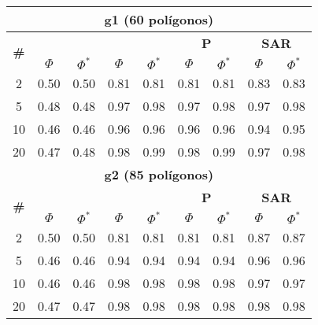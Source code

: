 \begin{table}
\begin{small}
		\bigskip
		\begin{tabular}{|c|cc|cc|cc|cc|}
			\hline
			\multicolumn{9}{|c|}{\textbf{g1 (60 pol\'igonos)}}\\
			\hline			
			\multirow{2}{*}{\textbf{\#}} &
			\multicolumn{2}{c|}{\textbf{\astar}} &
			\multicolumn{2}{c|}{\textbf{\ambush}} &
			\multicolumn{2}{c|}{\textbf{P}} &
			\multicolumn{2}{c|}{\textbf{SAR}}\\
			& $\Phi$ & $\Phi^*$ & $\Phi$ & $\Phi^*$&
			$\Phi$ & $\Phi^*$& $\Phi$ & $\Phi^*$\\
			\hline
			2 & 0.50 & 0.50 & 0.81 & 0.81 & 0.81 & 0.81 & 0.83 & 0.83\\
			5 & 0.48 & 0.48 & 0.97 & 0.98 & 0.97 & 0.98 & 0.97 & 0.98\\
			10 & 0.46 & 0.46 & 0.96 & 0.96 & 0.96 & 0.96 & 0.94 & 0.95\\
			20 & 0.47 & 0.48 & 0.98 & 0.99 & 0.98 & 0.99 & 0.97 & 0.98\\
			\hline
			\multicolumn{9}{|c|}{\textbf{g2 (85 pol\'igonos)}}\\
			\hline
			\multirow{2}{*}{\textbf{\#}} &
			\multicolumn{2}{c|}{\textbf{\astar}} &
			\multicolumn{2}{c|}{\textbf{\ambush}} &
			\multicolumn{2}{c|}{\textbf{P}} &
			\multicolumn{2}{c|}{\textbf{SAR}}\\
			& $\Phi$ & $\Phi^*$ & $\Phi$ & $\Phi^*$&
			$\Phi$ & $\Phi^*$& $\Phi$ & $\Phi^*$\\
			\hline
			2 & 0.50 & 0.50 & 0.81 & 0.81 & 0.81 & 0.81 & 0.87 & 0.87\\
			5 & 0.46 & 0.46 & 0.94 & 0.94 & 0.94 & 0.94 & 0.96 & 0.96\\
			10 & 0.46 & 0.46 & 0.98 & 0.98 & 0.98 & 0.98 & 0.97 & 0.97\\
			20 & 0.47 & 0.47 & 0.98 & 0.98 & 0.98 & 0.98 & 0.98 & 0.98\\
			\hline
		\end{tabular}
	\end{small}
\end{table}